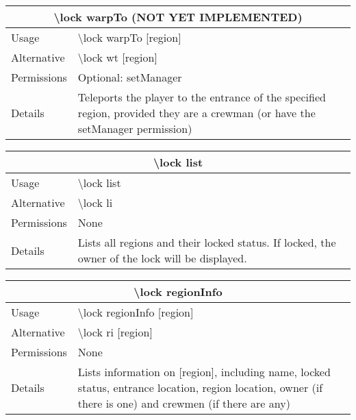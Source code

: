 \documentclass[a4paper,twoside,notitlepage,11pt]{article}
\begin{document}
\begin{center}
\begin{tabular}{|p{2cm}|p{12.5cm}|} \hline
\multicolumn{2}{|c|}{\textbf{\textbackslash lock warpTo (NOT YET IMPLEMENTED)}} \\ \hline
Usage       & \textbackslash lock warpTo [region] \\ \hline
Alternative & \textbackslash lock wt [region] \\ \hline
Permissions & Optional: setManager \\ \hline
Details 	& Teleports the player to the entrance of the specified region, provided they are a crewman (or have the setManager permission)\\ \hline
\end{tabular}
\end{center}

\begin{center}
\begin{tabular}{|p{2cm}|p{12.5cm}|} \hline
\multicolumn{2}{|c|}{\textbf{\textbackslash lock list}} \\ \hline
Usage       & \textbackslash lock list \\ \hline
Alternative & \textbackslash lock li \\ \hline
Permissions & None \\ \hline
Details 	& Lists all regions and their locked status. If locked, the owner of the lock will be displayed. \\ \hline
\end{tabular}
\end{center}

\begin{center}
\begin{tabular}{|p{2cm}|p{12.5cm}|} \hline
\multicolumn{2}{|c|}{\textbf{\textbackslash lock regionInfo}} \\ \hline
Usage       & \textbackslash lock regionInfo [region] \\ \hline
Alternative & \textbackslash lock ri [region] \\ \hline
Permissions & None \\ \hline
Details 	& Lists information on [region], including name, locked status, entrance location, region location, owner (if there is one) and crewmen (if there are any) \\ \hline
\end{tabular}
\end{center}
\end{document}
